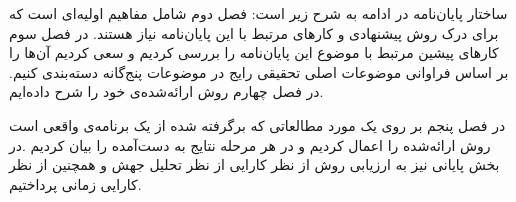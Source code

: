 
ساختار پایان‌نامه در ادامه به شرح زیر است: فصل دوم شامل مفاهیم اولیه‌ای است که برای درک روش پیشنهادی و کارهای مرتبط با این پایان‌نامه نیاز هستند. در فصل سوم کارهای پیشین مرتبط با موضوع این پایان‌نامه را بررسی کردیم و سعی کردیم آن‌ها را بر اساس فراوانی موضوعات اصلی تحقیقی رایج در موضوعات پنج‌گانه دسته‌بندی کنیم. در فصل چهارم روش ارائه‌شده‌ی خود را شرح داده‌ایم. 

در فصل پنجم بر روی یک مورد مطالعاتی که برگرفته شده از یک برنامه‌ی واقعی است روش ارائه‌شده را اعمال کردیم و در هر مرحله نتایج به دست‌آمده را بیان کردیم .در بخش پایانی نیز به ارزیابی روش از نظر کارایی از نظر تحلیل جهش و همچنین از نظر کارایی زمانی پرداختیم. 





